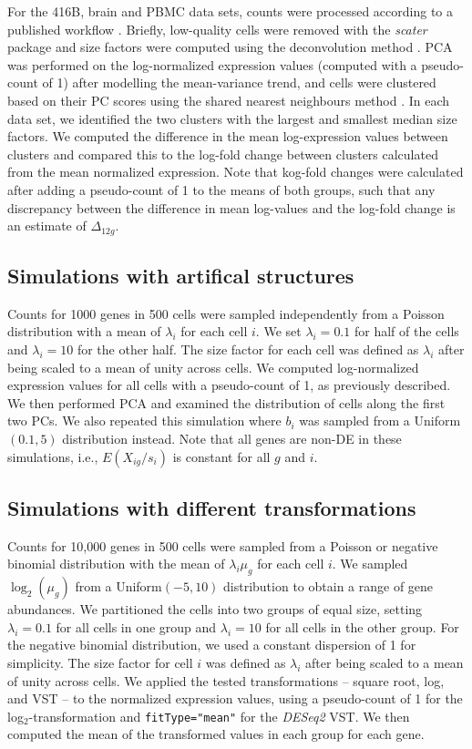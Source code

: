 \documentclass[10pt,letterpaper]{article}
\newcommand\code[1]{{\small\texttt{#1}}}
\begin{document}
For the 416B, brain and PBMC data sets, counts were processed according to a published workflow \cite{lun2016stepbystep}.
Briefly, low-quality cells were removed with the \emph{scater} package \cite{mccarthy2017scater} and size factors were computed using the deconvolution method \cite{lun2016pooling}.
PCA was performed on the log-normalized expression values (computed with a pseudo-count of 1) after modelling the mean-variance trend, 
and cells were clustered based on their PC scores using the shared nearest neighbours method \cite{xu2015identification}.
In each data set, we identified the two clusters with the largest and smallest median size factors.
We computed the difference in the mean log-expression values between clusters and compared this to the log-fold change between clusters calculated from the mean normalized expression.
Note that kog-fold changes were calculated after adding a pseudo-count of 1 to the means of both groups,
such that any discrepancy between the difference in mean log-values and the log-fold change is an estimate of $\Delta_{12g}$.

\subsection{Simulations with artifical structures}
Counts for 1000 genes in 500 cells were sampled independently from a Poisson distribution with a mean of $\lambda_i$ for each cell $i$. 
We set $\lambda_i=0.1$ for half of the cells and $\lambda_i=10$ for the other half.
The size factor for each cell was defined as $\lambda_i$ after being scaled to a mean of unity across cells.
We computed log-normalized expression values for all cells with a pseudo-count of 1, as previously described.
We then performed PCA and examined the distribution of cells along the first two PCs.
We also repeated this simulation where $b_i$ was sampled from a Uniform$(0.1, 5)$ distribution instead.
Note that all genes are non-DE in these simulations, i.e., $E(X_{ig}/s_i)$ is constant for all $g$ and $i$.

\subsection{Simulations with different transformations}
Counts for 10,000 genes in 500 cells were sampled from a Poisson or negative binomial distribution with the mean of $\lambda_i \mu_g$ for each cell $i$.
We sampled $\log_2(\mu_g)$ from a Uniform$(-5, 10)$ distribution to obtain a range of gene abundances.
We partitioned the cells into two groups of equal size, setting $\lambda_i=0.1$ for all cells in one group and $\lambda_i=10$ for all cells in the other group.
For the negative binomial distribution, we used a constant dispersion of 1 for simplicity.
The size factor for cell $i$ was defined as $\lambda_i$ after being scaled to a mean of unity across cells.
We applied the tested transformations -- square root, log, and VST -- to the normalized expression values, using a pseudo-count of 1 for the log$_2$-transformation and \code{fitType="mean"} for the \textit{DESeq2} VST.
We then computed the mean of the transformed values in each group for each gene.



\end{document}
